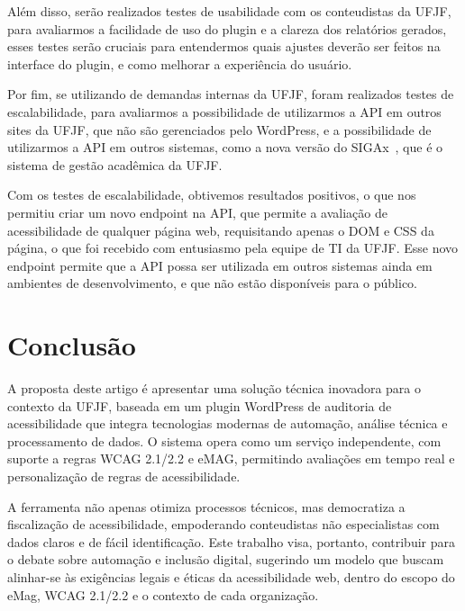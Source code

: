 \documentclass[
	article,			%
	12pt,				%
	oneside,			%
	a4paper,			%
	section=TITLE,		%
	subsection=TITLE,	%
	english,			%
	brazil,				%
	sumario=tradicional
	]{abntex2}
\begin{document}
Além disso, serão realizados testes de usabilidade com os conteudistas da
UFJF, para avaliarmos a facilidade de uso do plugin e a clareza dos relatórios
gerados, esses testes serão cruciais para entendermos quais ajustes deverão
ser feitos na interface do plugin, e como melhorar a experiência do usuário.


Por fim, se utilizando de demandas internas da UFJF, foram realizados testes
de escalabilidade, para avaliarmos a possibilidade de utilizarmos a API
em outros sites da UFJF, que não são gerenciados pelo WordPress, e a
possibilidade de utilizarmos a API em outros sistemas, como a nova versão do
SIGAx~\cite{SIGAx}, que é o sistema de gestão acadêmica da UFJF\@.


Com os testes de escalabilidade, obtivemos resultados positivos, o que nos
permitiu criar um novo endpoint na API, que permite a avaliação de acessibilidade
de qualquer página web, requisitando apenas o DOM e CSS da página, o que foi recebido
com entusiasmo pela equipe de TI da UFJF\@. Esse novo endpoint permite que
a API possa ser utilizada em outros sistemas ainda em ambientes de desenvolvimento,
e que não estão disponíveis para o público.

\section{Conclusão}
A proposta deste artigo é apresentar uma solução técnica inovadora para o
contexto da UFJF, baseada em um plugin WordPress de auditoria de acessibilidade
que integra tecnologias modernas de automação, análise técnica e
processamento de dados. O sistema opera como um serviço independente, com
suporte a regras WCAG 2.1/2.2 e eMAG, permitindo avaliações em tempo real
e personalização de regras de acessibilidade.

A ferramenta não apenas otimiza processos técnicos, mas democratiza
a fiscalização de acessibilidade, empoderando conteudistas não especialistas
com dados claros e de fácil identificação. Este trabalho visa, portanto, contribuir
para o debate sobre automação e inclusão digital, sugerindo um modelo que buscam alinhar-se às exigências legais e éticas da
acessibilidade web, dentro do escopo do eMag, WCAG 2.1/2.2 e o contexto de cada
organização.

\end{document}
